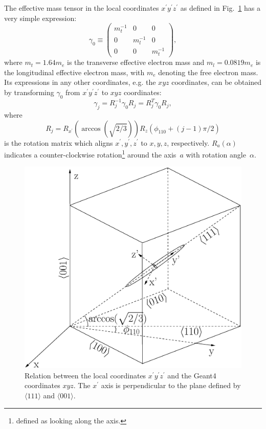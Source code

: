 \documentclass[epj,referee]{svjour}
\begin{document}
The effective mass tensor in the local coordinates $x^{\prime}
y^{\prime} z^{\prime}$ as defined in Fig.~\ref{f:axes} has a very
simple expression:
\begin{equation} 
\label{e:g0} 
\gamma_{0} \equiv \left( 
\begin{array}{ccc} 
m_{t}^{-1} & 0 & 0 \\ 
0 & m_{l}^{-1} & 0 \\ 
0 & 0 & m_{t}^{-1} 
\end{array} \right), 
\end{equation} 
where $m_{t} = 1.64m_{e}$ is the transverse effective electron mass
and $m_{l} = 0.0819m_{e}$ is the longitudinal effective electron mass,
with $m_{e}$ denoting the free electron mass. Its expressions in any
other coordinates, e.g. the $xyz$ coordinates, can be obtained by
transforming $\gamma_{0}$ from $x^{\prime} y^{\prime} z^{\prime}$ to
$xyz$ coordinates:
\begin{equation} 
\label{e:gs} 
\gamma_{j} = R_{j}^{-1}\gamma_{0}R_{j} = R_{j}^{T}\gamma_{0}R_{j}, 
\end{equation} 
where 
\begin{equation} 
\label{e:rs} 
R_{j} = R_{x^{\prime}}(\arccos(\sqrt{2/3}))R_{z}(\phi_{110}+(j-1)\pi/2) 
\end{equation} 
is the rotation matrix which aligns $x^{\prime}, y^{\prime},
z^{\prime}$ to $x,y,z$, respectively. $R_a(\alpha)$ indicates a
counter-clockwise rotation\footnote{defined as looking along the
axis.} around the axis~$a$ with rotation angle~$\alpha$.
 
\begin{figure}[htpb]
\centering
\includegraphics[width=0.7\linewidth]{axes}   
\caption{Relation between the local coordinates $x^{\prime} y^{\prime}
z^{\prime}$ and the Geant4 coordinates $xyz$. The $x^{\prime}$ axis is
perpendicular to the plane defined by $\langle111\rangle$ and $\langle
001 \rangle$.}
\label{f:axes} 
\end{figure} 
\end{document}
